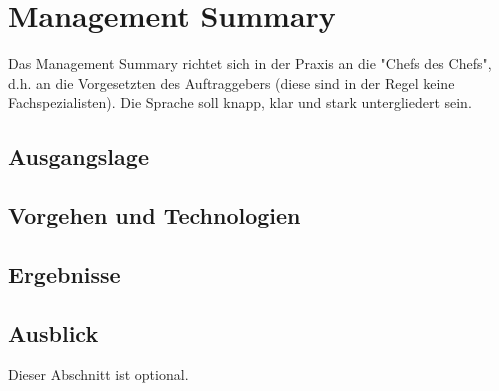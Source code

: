 \section{Management Summary}
Das Management Summary richtet sich in der Praxis an die "Chefs des Chefs", d.h. an die Vorgesetzten des Auftraggebers (diese sind in der Regel keine Fachspezialisten). Die Sprache soll knapp, klar und stark untergliedert sein.

\subsection{Ausgangslage}

\subsection{Vorgehen und Technologien}

\subsection{Ergebnisse}

\subsection{Ausblick}
Dieser Abschnitt ist optional.